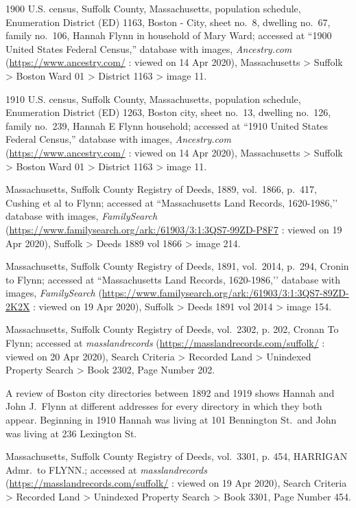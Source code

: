 \begin{thebibliography}{999}
	1900 U.S. census, Suffolk County, Massachusetts, population schedule, Enumeration District (ED) 1163, Boston - City, sheet no.\ 8, dwelling no.\ 67, family no.\ 106, Hannah Flynn in household of Mary Ward; accessed at ``1900 United States Federal Census,'' database with images, \textit{Ancestry.com} (\url{https://www.ancestry.com/} : viewed on 14 Apr 2020), Massachusetts > Suffolk > Boston Ward 01 > District 1163 > image 11.	
	
	1910 U.S. census, Suffolk County, Massachusetts, population schedule, Enumeration District (ED) 1263, Boston city, sheet no.\ 13, dwelling no.\ 126, family no.\ 239, Hannah E Flynn household; accessed at ``1910 United States Federal Census,'' database with images, \textit{Ancestry.com} (\url{https://www.ancestry.com/} : viewed on 14 Apr 2020), Massachusetts > Suffolk > Boston Ward 01 > District 1163 > image 11.
	
	Massachusetts, Suffolk County Registry of Deeds, 1889, vol.\ 1866, p.\ 417, Cushing et al to Flynn; accessed at ``Massachusetts Land Records, 1620-1986,’’ database with images, \textit{FamilySearch} (\url{https://www.familysearch.org/ark:/61903/3:1:3QS7-99ZD-P8F7} : viewed on 19 Apr 2020), Suffolk > Deeds 1889 vol 1866 > image 214.
	
	Massachusetts, Suffolk County Registry of Deeds, 1891, vol.\ 2014, p.\ 294, Cronin to Flynn; accessed at ``Massachusetts Land Records, 1620-1986,’’ database with images, \textit{FamilySearch} (\url{https://www.familysearch.org/ark:/61903/3:1:3QS7-89ZD-2K2X} : viewed on 19 Apr 2020), Suffolk > Deeds 1891 vol 2014 > image 154.
	
	Massachusetts, Suffolk County Registry of Deeds, vol.\ 2302, p. 202, Cronan To Flynn; accessed at \textit{masslandrecords} (\url{https://masslandrecords.com/suffolk/} : viewed on 20 Apr 2020), Search Criteria > Recorded Land > Unindexed Property Search > Book 2302, Page Number 202.
	
	A review of Boston city directories between 1892 and 1919 shows Hannah and John J.\ Flynn at different addresses for every directory in which they both appear. Beginning in 1910 Hannah was living at 101 Bennington St.\ and John was living at 236 Lexington St.
	
	Massachusetts, Suffolk County Registry of Deeds, vol.\ 3301, p. 454, HARRIGAN Admr.\ to FLYNN.; accessed at \textit{masslandrecords} (\url{https://masslandrecords.com/suffolk/} : viewed on 19 Apr 2020), Search Criteria > Recorded Land > Unindexed Property Search >  Book 3301, Page Number 454.
	

\end{thebibliography}
